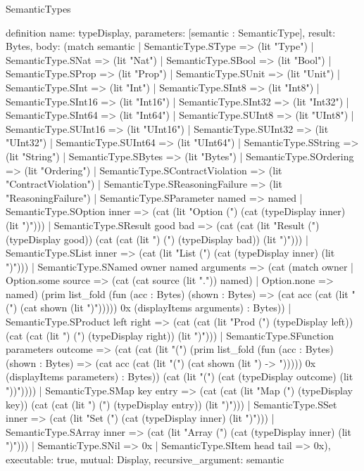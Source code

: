 \begin{lexlean}{SemanticTypes}
\begin{semanticmodule}
definition{
  name: typeDisplay,
  parameters: [semantic : SemanticType],
  result: Bytes,
  body: (match semantic
    | SemanticType.SType => (lit "Type")
    | SemanticType.SNat => (lit "Nat")
    | SemanticType.SBool => (lit "Bool")
    | SemanticType.SProp => (lit "Prop")
    | SemanticType.SUnit => (lit "Unit")
    | SemanticType.SInt => (lit "Int")
    | SemanticType.SInt8 => (lit "Int8")
    | SemanticType.SInt16 => (lit "Int16")
    | SemanticType.SInt32 => (lit "Int32")
    | SemanticType.SInt64 => (lit "Int64")
    | SemanticType.SUInt8 => (lit "UInt8")
    | SemanticType.SUInt16 => (lit "UInt16")
    | SemanticType.SUInt32 => (lit "UInt32")
    | SemanticType.SUInt64 => (lit "UInt64")
    | SemanticType.SString => (lit "String")
    | SemanticType.SBytes => (lit "Bytes")
    | SemanticType.SOrdering => (lit "Ordering")
    | SemanticType.SContractViolation => (lit "ContractViolation")
    | SemanticType.SReasoningFailure => (lit "ReasoningFailure")
    | SemanticType.SParameter named => named
    | SemanticType.SOption inner => (cat (lit "Option (") (cat (typeDisplay inner) (lit ")")))
    | SemanticType.SResult good bad => (cat (cat (lit "Result (") (typeDisplay good)) (cat (cat (lit ") (") (typeDisplay bad)) (lit ")")))
    | SemanticType.SList inner => (cat (lit "List (") (cat (typeDisplay inner) (lit ")")))
    | SemanticType.SNamed owner named arguments => (cat (match owner
      | Option.some source => (cat (cat source (lit ".")) named)
      | Option.none => named) (prim list_fold (fun (acc : Bytes) (shown : Bytes) => (cat acc (cat (lit " (") (cat shown (lit ")"))))) 0x (displayItems arguments) : Bytes))
    | SemanticType.SProduct left right => (cat (cat (lit "Prod (") (typeDisplay left)) (cat (cat (lit ") (") (typeDisplay right)) (lit ")")))
    | SemanticType.SFunction parameters outcome => (cat (cat (lit "(") (prim list_fold (fun (acc : Bytes) (shown : Bytes) => (cat acc (cat (lit "(") (cat shown (lit ") -> "))))) 0x (displayItems parameters) : Bytes)) (cat (lit "(") (cat (typeDisplay outcome) (lit "))"))))
    | SemanticType.SMap key entry => (cat (cat (lit "Map (") (typeDisplay key)) (cat (cat (lit ") (") (typeDisplay entry)) (lit ")")))
    | SemanticType.SSet inner => (cat (lit "Set (") (cat (typeDisplay inner) (lit ")")))
    | SemanticType.SArray inner => (cat (lit "Array (") (cat (typeDisplay inner) (lit ")")))
    | SemanticType.SNil => 0x
    | SemanticType.SItem head tail => 0x),
  executable: true,
  mutual: Display,
  recursive_argument: semantic
}


\end{semanticmodule}
\end{lexlean}
